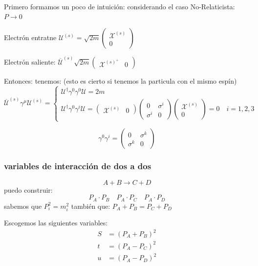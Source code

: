 \documentclass[a4paper,12pt]{article}
\begin{document}
Primero formamos un poco de intuición: considerando el caso No-Relaticista: $P \to 0$ 

Electrón entratne $ \mathcal{U}^{(s)} = \sqrt{2m}\begin{pmatrix}
    \mathcal{X}^{(s)} \\0
\end{pmatrix}  $

Electrón saliente: $\overline{\mathcal{U}  }^{(s)}\sqrt{2m} \begin{pmatrix}
    \mathcal{X}^{(s)^+  } &0
\end{pmatrix}  $


Entonces: tenemos: (esto es cierto si tenemos la particula con el mismo espín) 
\[
\overline{\mathcal{U}}^{(s)}  \gamma^\mu \mathcal{U}^{(s)} = \begin{cases}
    \mathcal{U}^\dagger \gamma^0\gamma^0 \mathcal{U}  =2m  \\
    \mathcal{U}^\dagger \gamma^0 \gamma^i \mathcal{U} = \begin{pmatrix}
        \mathcal{X  } ^{(s)} &0  
    \end{pmatrix} \begin{pmatrix}
        0&\sigma^i \\\sigma^i &0
    \end{pmatrix} \begin{pmatrix}
        \mathcal{X}^{(s)}  \\0
    \end{pmatrix} =0\quad i =1,2,3
 \end{cases}
\]





\[
\gamma^0\gamma^i = \begin{pmatrix}
    0 &\sigma^k \\ \sigma^k &0
\end{pmatrix} 
\]

\subsubsection{variables  de interacción de dos a dos} 

\[
A+B \to C+D
\]
puedo construir:
\[
P_A\cdot P_B \quad P_A\cdot P_C\quad P_A\cdot P_D
\]
sabemos que $P_i ^2 =m_i^2$ también que: $P_A+P_B=P_C+P_D$

Escogemos las siguientes variables: 
\begin{align*}
    S &= (P_A+P_B)^2 \\
    t &= (P_A-P_C)^2 \\
    u &= (P_A-P_D)^2
\end{align*}
\end{document}

